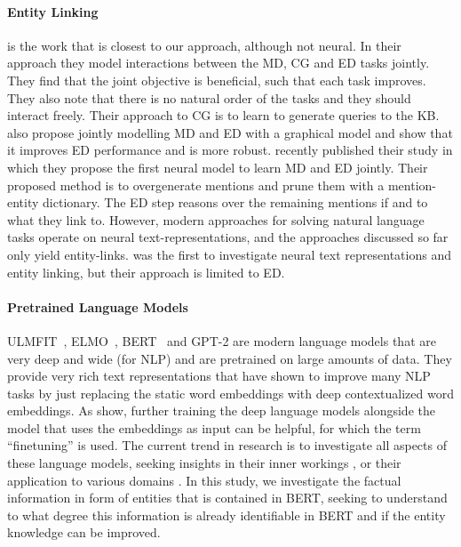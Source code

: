 \documentclass[11pt,a4paper]{article}
\begin{document}
\paragraph{Entity Linking} \citet{DBLP:journals/tacl/DurrettK14/JointEntity} is the work that is closest to our approach, although not neural. In their approach they model interactions between the MD, CG and ED tasks jointly. They find that the joint objective is beneficial, such that each task improves. They also note that there is no natural order of the tasks and they should interact freely. Their approach to CG is to learn to generate queries to the KB. \citet{DBLP:journals/tacl/NguyenTW16/JNERD} also propose jointly modelling MD and ED  with a graphical model and show that it improves ED performance and is more robust. \citet{kolitsas-etal-2018-end/Ganea} recently published their study in which they propose the first neural model to learn MD and ED jointly. Their proposed method is to overgenerate mentions and prune them with a mention-entity dictionary. The ED step reasons over the remaining mentions if and to what they link to. However, modern approaches for solving natural language tasks operate on neural text-representations, and the approaches discussed so far only yield entity-links. \citet{DBLP:conf/conll/YamadaS0T16, DBLP:journals/tacl/YamadaSTT17} was the first to investigate neural text representations and entity linking, but their approach is limited to ED.

\paragraph{Pretrained Language Models} ULMFIT~\citep{DBLP:conf/acl/RuderH18}, ELMO~\cite{DBLP:conf/naacl/PetersNIGCLZ18}, BERT~\citep{DBLP:conf/naacl/DevlinCLT19} and GPT-2 \citep{radford2019language} are modern language models that are very deep and wide (for NLP) and are pretrained on large amounts of data. They provide very rich text representations that have shown to improve many NLP tasks by just replacing the static word embeddings with deep contextualized word embeddings. As  \citet{DBLP:conf/rep4nlp/PetersRS19} show, further training the deep language models alongside the model that uses the embeddings as input can be helpful, for which the term ``finetuning'' is used. The current trend in research is to investigate all aspects of these language models, seeking insights in their inner workings \citep{DBLP:conf/acl/TenneyDP19}, or their application to various domains \citep{DBLP:journals/corr/abs-1903-10676/scibert, DBLP:journals/corr/abs-1901-08746/biobert}. In this study, we investigate the factual information in form of entities that is contained in BERT, seeking to understand to what degree this information is already identifiable in BERT and if the entity knowledge can be improved.
\end{document}
